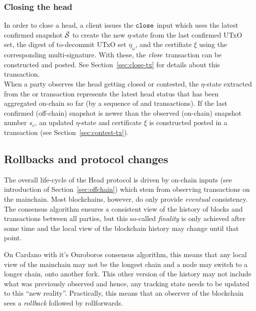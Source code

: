 \subsubsection{Closing the head}

\quad In order to close a head, a client issues the
$\mathtt{close}$ input which uses the latest confirmed snapshot $\bar{\mathcal S}$ to
create the new $\eta$-state from the last confirmed UTxO set, the digest of
to-decommit UTxO set $\eta_{\omega}$, and the certifiate $\xi$ using the corresponding
multi-signature. With these, the $\textit{close}$ transaction can be constructed and
posted. See Section~\ref{sec:close-tx} for details about this transaction. \\

\quad When a party observes
the head getting closed or contested, the $\eta$-state extracted from the
\mtxClose{} or \mtxContest{} transaction represents the latest head status that
has been aggregated on-chain so far (by a sequence of \mtxClose{} and
\mtxContest{} transactions). If the last confirmed (off-chain) snapshot is newer
than the observed (on-chain) snapshot number $s_{c}$, an updated $\eta$-state
and certificate $\xi$ is constructed posted in a \mtxContest{} transaction (see
Section~\ref{sec:contest-tx}).

\subsection{Rollbacks and protocol changes}\label{sec:rollbacks}
The overall life-cycle of the Head protocol is driven by on-chain inputs (see
introduction of Section~\ref{sec:offchain}) which stem from observing
transactions on the mainchain. Most blockchains, however, do only provide
\emph{eventual} consistency. The consensus algorithm ensures a consistent view
of the history of blocks and transactions between all parties, but this
so-called \emph{finality} is only achieved after some time and the local view of
the blockchain history may change until that point.

On Cardano with it's Ouroboros consensus algorithm, this means that any local
view of the mainchain may not be the longest chain and a node may switch to a
longer chain, onto another fork. This other version of the history may not
include what was previously observed and hence, any tracking state needs to be
updated to this ``new reality''. Practically, this means that an observer of the
blockchain sees a \emph{rollback} followed by rollforwards.

